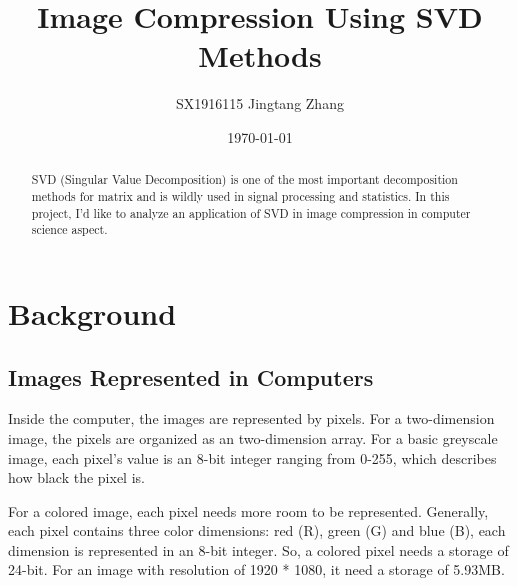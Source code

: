 \documentclass{article}
\begin{document}
    \title{Image Compression Using SVD Methods}
    \author{SX1916115 Jingtang Zhang}
    \date{\today}

    \maketitle

    \newpage

    \begin{abstract}
        SVD (Singular Value Decomposition)
        is one of the most important decomposition methods for matrix
        and is wildly used in signal processing and statistics.
        In this project, I’d like to analyze an application of
        SVD in image compression in computer science aspect.
    \end{abstract}

    \section{Background}

        \subsection{Images Represented in Computers}
            \par
            Inside the computer, the images are represented by pixels.
            For a two-dimension image,
            the pixels are organized as an two-dimension array.
            For a basic greyscale image,
            each pixel’s value is an 8-bit integer ranging from 0-255,
            which describes how black the pixel is.
            \par
            For a colored image, each pixel needs more room to be represented.
            Generally, each pixel contains three color dimensions: 
            red (R), green (G) and blue (B),
            each dimension is represented in an 8-bit integer. 
            So, a colored pixel needs a storage of 24-bit.
            For an image with resolution of 1920 * 1080,
            it need a storage of 5.93MB.
\end{document}
